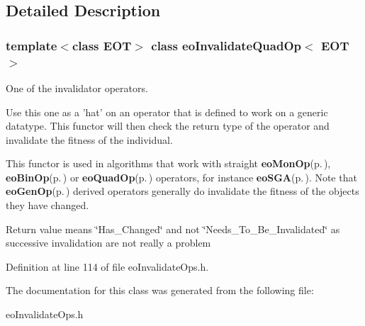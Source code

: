 \subsection{Detailed Description}
\subsubsection*{template$<$class EOT$>$ class eo\-Invalidate\-Quad\-Op$<$ EOT $>$}

One of the invalidator operators. 

Use this one as a 'hat' on an operator that is defined to work on a generic datatype. This functor will then check the return type of the operator and invalidate the fitness of the individual.

This functor is used in algorithms that work with straight {\bf eo\-Mon\-Op}{\rm (p.\,\pageref{classeo_mon_op})}, {\bf eo\-Bin\-Op}{\rm (p.\,\pageref{classeo_bin_op})} or {\bf eo\-Quad\-Op}{\rm (p.\,\pageref{classeo_quad_op})} operators, for instance {\bf eo\-SGA}{\rm (p.\,\pageref{classeo_s_g_a})}. Note that {\bf eo\-Gen\-Op}{\rm (p.\,\pageref{classeo_gen_op})} derived operators generally do invalidate the fitness of the objects they have changed.

Return value means \char`\"{}Has\_\-Changed\char`\"{} and not \char`\"{}Needs\_\-To\_\-Be\_\-Invalidated\char`\"{} as successive invalidation are not really a problem 



Definition at line 114 of file eo\-Invalidate\-Ops.h.

The documentation for this class was generated from the following file:\begin{CompactItemize}
\item 
eo\-Invalidate\-Ops.h\end{CompactItemize}
